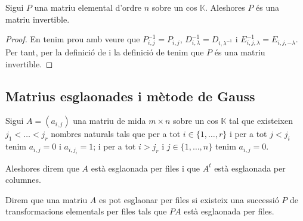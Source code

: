 \documentclass[../Apunts.tex]{subfiles}
\begin{document}
	\begin{proposition}
		\label{prop:les matrius elementals són invertibles}
		Sigui \(P\) una matriu elemental d'ordre \(n\) sobre un cos \(\mathbb{K}\). Aleshores \(P\) és una matriu invertible.
		\begin{proof}
			En tenim prou amb veure que \(P_{i,j}^{-1}=P_{i,j}\), \(D_{i,\lambda}^{-1}=D_{i,\lambda^{-1}}\) i \(E_{i,j,\lambda}^{-1}=E_{i,j,-\lambda}\). Per tant, per la definició de  i la definició de  tenim que \(P\) és una matriu invertible.
		\end{proof}
	\end{proposition}
	\subsection{Matrius esglaonades i mètode de Gauss}
	\begin{definition}
		\label{def:matriu esglaonada}
		Sigui \(A=(a_{i,j})\) una matriu de mida \(m\times n\) sobre un cos \(\mathbb{K}\) tal que existeixen \(j_{1}<\dots<j_{r}\) nombres naturals tals que per a tot \(i\in\{1,\dots,r\}\) i per a tot \(j<j_{i}\) tenim \(a_{i,j}=0\) i \(a_{i,j_{i}}=1\); i per a tot \(i>j_{r}\) i \(j\in\{1,\dots,n\}\) tenim \(a_{i,j}=0\).
		
		Aleshores direm que \(A\) està esglaonada per files i que \(A^{t}\) està esglaonada per columnes.
		
		Direm que una matriu \(A\) es pot esglaonar per files si existeix una successió \(P\) de transformacions elementals per files tals que \(PA\) està esglaonada per files.
	\end{definition}
\end{document}
